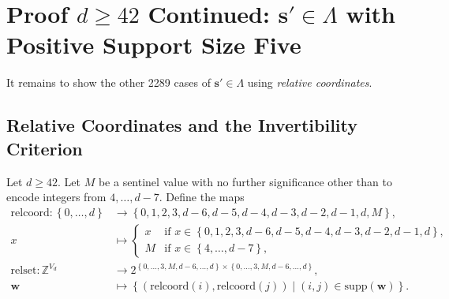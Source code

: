 \section{Proof \( d \geq 42\) Continued: \( \mathbf{s}' \in \Lambda\) with Positive Support Size Five}

It remains to show the other 2289 cases of \( \mathbf{s}' \in \Lambda \) using \emph{relative coordinates}.

\subsection{Relative Coordinates and the Invertibility Criterion}

\begin{definition}
    Let \( d \geq 42 \).
    Let \( M \) be a sentinel value with no further significance other than to encode integers from \( 4, \dots, d-7 \). Define the maps 
    \begin{align*}
        \mathrm{relcoord}: \left\{ 0, \dots, d \right\} &\to \left\{ 0,1,2,3,d-6,d-5,d-4,d-3,d-2,d-1,d,M \right\}, \\
        x &\mapsto \begin{cases}
            x & \text{if } x \in \left\{ 0,1,2,3, d-6,d-5,d-4,d-3,d-2,d-1,d \right\}, \\
            M& \text{if } x \in \left\{ 4, \dots, d-7 \right\},
        \end{cases}\\
        \mathrm{relset}: \mathbb{Z}^{V_d} &\to 2^{\left\{ 0, \dots, 3, M, d-6, \dots, d \right\} \times \left\{ 0, \dots, 3, M, d-6, \dots, d \right\}}, \\
        \mathbf{w} &\mapsto \left\{ (\mathrm{relcoord}(i), \mathrm{relcoord}(j)) \mid (i,j) \in \mathrm{supp}(\mathbf{w}) \right\}.
    \end{align*}
\end{definition}

